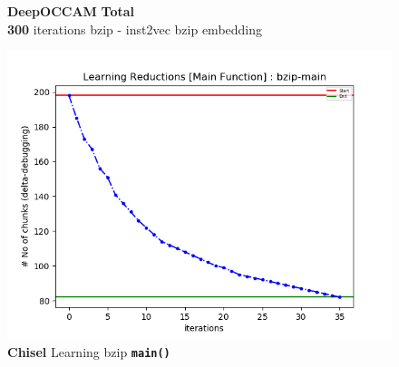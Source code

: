 \documentclass{relatorio}
\begin{document}
\begin{figure}[H]
	\caption{\textbf{DeepOCCAM} \textbf{Total} \\ \textbf{300} iterations \color{blue} bzip - inst2vec bzip embedding}%
	\label{fig:plant}
	\centering
	\captionsetup{justification=centering}
	\includegraphics[width=1\linewidth]{imgs/plots/chisel_learning_bzip-main_plot.png}
	\caption{\textbf{Chisel} Learning bzip \textbf{\texttt{main()}}}%
	\label{fig:plant}
\end{figure}
\end{document}
